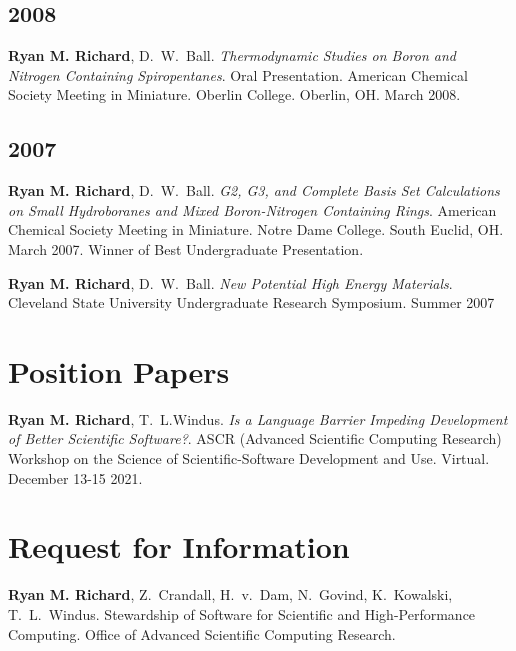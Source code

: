 \documentclass[11pt,a4paper,sans]{moderncv}
\begin{document}
\begin{etaremune}
	\subsection{2008}

	\item{\textbf{Ryan M. Richard}, D.~W.~Ball.\textit{ Thermodynamic Studies on Boron and Nitrogen Containing Spiropentanes}. Oral Presentation.  American Chemical Society Meeting in Miniature. Oberlin College. Oberlin, OH.  March 2008.}

	\subsection{2007}
	\item{\textbf{Ryan M. Richard}, D.~W.~Ball. \textit{G2, G3, and Complete Basis Set Calculations on Small Hydroboranes and Mixed Boron-Nitrogen Containing Rings}. American Chemical Society Meeting in Miniature. Notre Dame College. South Euclid, OH.  March 2007. Winner of Best Undergraduate Presentation.}

	\item{\textbf{Ryan M. Richard}, D.~W.~Ball. \textit{New Potential High Energy Materials}. Cleveland State University Undergraduate Research Symposium. Summer 2007}

\end{etaremune}

\section{Position Papers}
\begin{etaremune}
	\item{\textbf{Ryan M. Richard}, T.~L.Windus. \emph{Is a Language Barrier
	Impeding Development of Better Scientific Software?}. ASCR (Advanced
	Scientific Computing Research) Workshop on the Science of
	Scientific-Software Development and Use. Virtual. December 13-15 2021.}
\end{etaremune}

\section{Request for Information}
\begin{etaremune}
	\item{\textbf{Ryan M. Richard}, Z.~Crandall, H.~v.~Dam, N.~Govind,
	K.~Kowalski, T.~L.~Windus. Stewardship of Software for Scientific and
	High-Performance Computing. Office of Advanced Scientific Computing
	Research.
	}
\end{etaremune}
\end{document}
